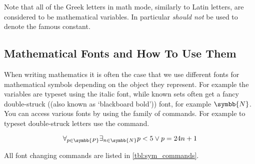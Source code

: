 Note that all of the Greek letters in math mode, similarly to Latin letters,
are considered to be mathematical variables. In particular 
\emph{should not} be used to denote the famous constant.

\subsection{Mathematical Fonts and How To Use Them}

When writing mathematics it is often the case that we use different fonts for
mathematical symbols depending on the object they represent. For example the
variables are typeset using the italic font, while known sets often get
a fancy double-struck ((also known as \enquote*{blackboard bold})) font, for example \(\symbb{N}\). You can access various fonts by using
the family of  commands. For example to typeset double-struck
letters use the  command.
\begin{example}
\[
  \forall_{p \in \symbb{P}}
  \exists_{n \in \symbb{N}}
  p < 5 \lor p = 24n + 1
\]
\end{example}
All font changing commands are listed in \autoref{tbl:sym_commands}.
